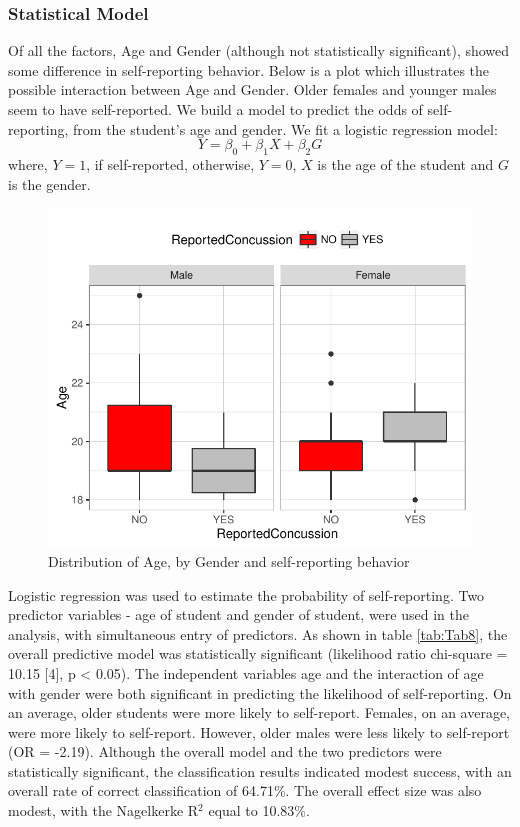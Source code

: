 \documentclass[11]{article}
\begin{document}
\subsubsection*{Statistical Model}
Of all the factors, Age and Gender (although not statistically significant), showed some difference in self-reporting behavior. Below is a plot which illustrates the possible interaction between Age and Gender. Older females and younger males seem to have self-reported. We build a model to predict the odds of self-reporting, from the student's age and gender. We fit a logistic regression model:
\begin{equation}
Y = \beta_0 + \beta_1 X + \beta_2 G
\label{eq:Eq1}
\end{equation}
where, $Y = 1$, if self-reported, otherwise, $Y=0$, $X$ is the age of the student and $G$ is the gender. 


\begin{figure}[H]
\centering
\includegraphics[width=0.5\linewidth]{Plot3AgeGender.pdf}
\caption{Distribution of Age, by Gender and self-reporting behavior}
\label{fig:Fig3AgeGender}
\end{figure}


Logistic regression was used to estimate the probability of self-reporting. Two predictor variables - age of student and gender of student, were used in the analysis, with simultaneous entry of predictors. As shown in table \ref{tab:Tab8}, the overall predictive model was statistically significant (likelihood ratio chi-square = 10.15 [4], p < 0.05). The independent variables age and the interaction of age with gender were both significant in predicting the likelihood of self-reporting. On an average, older students were more likely to self-report. Females, on an average, were more likely to self-report. However, older males were less likely to self-report (OR = -2.19). Although the overall model and the two predictors were statistically significant, the classification results indicated modest success, with an overall rate of correct classification of 64.71\%. The overall effect size was also modest, with the Nagelkerke R$^2$ equal to 10.83\%.
\end{document}
